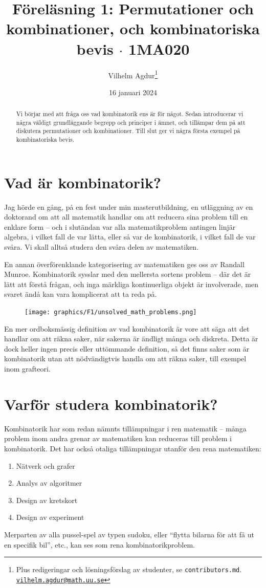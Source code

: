 \documentclass{tufte-handout}
\title{Föreläsning 1: Permutationer och kombinationer, och kombinatoriska bevis $\cdot$ 1MA020}
\author[Vilhelm Agdur]{Vilhelm Agdur\thanks{Plus redigeringar och lösningsförslag av studenter, se \nolinkurl{contributors.md}.\\\href{mailto:vilhelm.agdur@math.uu.se}{\nolinkurl{vilhelm.agdur@math.uu.se}}}}
\date{16 januari 2024}
\begin{document}
\maketitle%

\begin{abstract}
\noindent
Vi börjar med att fråga oss vad kombinatorik ens är för något. Sedan introducerar vi några väldigt grundläggande begrepp och principer i ämnet, och tillämpar dem på att diskutera permutationer och kombinationer. Till slut ger vi några första exempel på kombinatoriska bevis.
\end{abstract}

\section{Vad är kombinatorik?}

Jag hörde en gång, på en fest under min masterutbildning, en utläggning av en doktorand om att all matematik handlar om att reducera sina problem till en enklare form -- och i slutändan var alla matematikproblem antingen linjär algebra, i vilket fall de var lätta, eller så var de kombinatorik, i vilket fall de var svåra. Vi skall alltså studera den svåra delen av matematiken.

En annan överförenklande kategorisering av matematiken ges oss av Randall Munroe.\cite{XKCD_math_classification} Kombinatorik sysslar med den mellersta sortens problem -- där det är lätt att förstå frågan, och inga märkliga kontinuerliga objekt är involverade, men svaret ändå kan vara komplicerat att ta reda på.

\begin{figure}[h]
	\texttt{[image: graphics/F1/unsolved\_math\_problems.png]}
\end{figure}

En mer ordboksmässig definition av vad kombinatorik är vore att säga att det handlar om att räkna saker, när sakerna är ändligt många och diskreta. Detta är dock heller ingen precis eller uttömmande definition, så det finns saker som är kombinatorik utan att nödvändigtvis handla om att räkna saker, till exempel inom grafteori.

\section{Varför studera kombinatorik?}

Kombinatorik har som redan nämnts tillämpningar i ren matematik -- många problem inom andra grenar av matematiken kan reduceras till problem i kombinatorik. Det har också otaliga tillämpningar utanför den rena matematiken:
\begin{enumerate}
	\item Nätverk och grafer
	\item Analys av algoritmer
	\item Design av kretskort
	\item Design av experiment
\end{enumerate}
Merparten av alla pussel-spel av typen sudoku, eller ``flytta bilarna för att få ut en specifik bil'', etc., kan ses som rena kombinatorikproblem.
\end{document}
